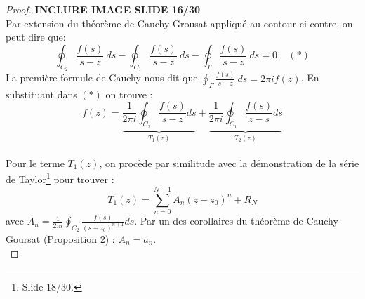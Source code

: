 	
\begin{proof}
	\textbf{INCLURE IMAGE SLIDE 16/30}\\
	Par extension du théorème de Cauchy-Grousat appliqué au contour ci-contre, on peut dire que:
	\begin{equation}
		\oint_{C_2} \frac{f(s)}{s-z}\ ds -	\oint_{C_1} \frac{f(s)}{s-z}\ ds -\oint_{\Gamma}
		\frac{f(s)}{s-z}\ ds = 0\ \ \ \ \ (*)
	\end{equation}
	La première formule de Cauchy nous dit que $\oint_\Gamma \frac{f(s)}{s-z}\ ds = 2\pi i f(z)$.
	En substituant dans $(*)$ on trouve :
	\begin{equation}
		f(z) = \underbrace{\dfrac{1}{2\pi i}\oint_{C_2} \frac{f(s)}{s-z}ds}_{T_1(z)} + \underbrace{
			\dfrac{1}{2\pi i}\oint_{C_1} \frac{f(s)}{z-s}ds}_{T_2(z)}
	\end{equation}\ \\
		
	Pour le terme $T_1(z)$, on procède par similitude avec la démonstration de la série de 
	Taylor\footnote{Slide 18/30.} pour trouver :
	\begin{equation}
		T_1(z) = \sum_{n=0}^{N-1} A_n(z-z_0)^n + R_N
	\end{equation}
	avec $A_n = \frac{1}{2\pi i}\oint_{C_2} \frac{f(s)}{(s-z_0)^{n+1}}ds$. Par un des 
	corollaires du théorème de Cauchy-Goursat (Proposition 2) : $A_n = a_n$.\\
		

\end{proof}
